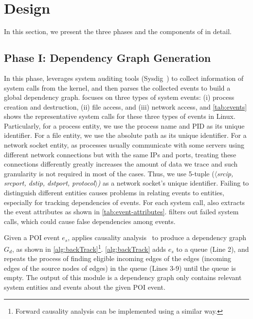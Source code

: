 \section{\tool Design}
\label{sec:approach}
In this section, we present the three phases and the components of \tool in detail.


\subsection{Phase I: Dependency Graph Generation}
\label{subsec:graph-generation}

In this phase, \tool leverages system auditing tools (\eg Sysdig~\cite{sysdig}) to collect information of system calls from the kernel, and then parses the collected events to build a global dependency graph.
\tool focuses on three types of system events: (i) process creation and destruction, (ii) file access, and (iii) network access,
and \cref{tab:events} shows the representative system calls for these three types of events in Linux.
Particularly, for a process entity, we use the process name and PID as its unique identifier.
For a file entity, we use the absolute path as its unique identifier. 
For a network socket entity, as processes usually communicate with some servers using different network connections but with the same IPs and ports, treating these connections differently greatly increases the amount of data we trace and such granularity is not required in most of the cases. Thus, we use 5-tuple (\emph{$\langle$srcip, srcport, dstip, dstport, protocol$\rangle$)} as a network socket's unique identifier. 
Failing to distinguish different entities causes problems in relating events to entities, especially for tracking dependencies of events.
For each system call, \tool also extracts the event attributes as shown in \cref{tab:event-attributes}.
\tool filters out failed system calls, which could cause false dependencies among events.



Given a POI event $e_s$, \tool applies causality analysis~\cite{backtracking} to produce a dependency graph $G_d$, as shown in \cref{alg:backTrack}\footnote{Forward causality analysis can be implemented using a similar way.}.
\cref{alg:backTrack} adds $e_s$ to a queue (Line 2), and repeats the process of finding eligible incoming edges of the edges (\ie incoming edges of the source nodes of edges) in the queue (Lines 3-9) until the queue is empty. The output of this module is a dependency graph only contains relevant system entities and events about the given POI event.



